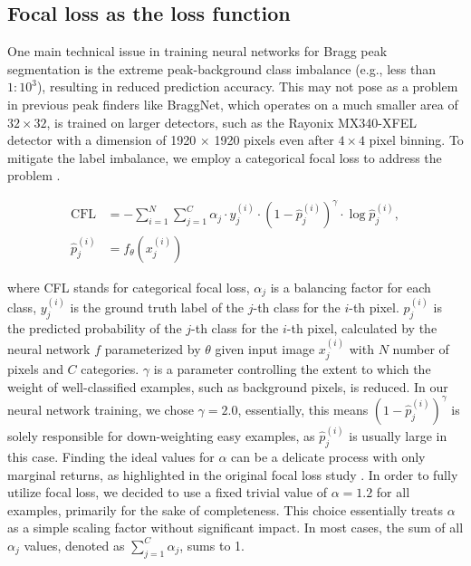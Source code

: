 \documentclass[a4paper]{article}
\begin{document}
\subsection{Focal loss as the loss function}

One main technical issue in training neural networks for Bragg peak segmentation is the extreme peak-background class imbalance (e.g., less than $1 : 10^3$), resulting in reduced prediction accuracy.  This may not pose as a problem in previous peak finders like BraggNet, which operates on a much smaller area of $32 \times 32$, \peaknet{} is trained on larger detectors, such as the Rayonix MX340-XFEL detector with a dimension of 1920 $\times$ 1920 pixels even after $4 \times 4$ pixel binning.  To mitigate the label imbalance, we employ a categorical focal loss to address the problem \citep{linFocalLossDense2018}.

\begin{align}
\text{CFL} &= - \sum_{i = 1}^{N}\sum_{j = 1}^{C} 
            \alpha_j \cdot y_j^{(i)} \cdot (1-\hat{p}_j^{(i)})^\gamma 
            \cdot \log{\hat{p}_j^{(i)}}, \\
\hat{p}_j^{(i)} &= f_\theta(x_j^{(i)})
\end{align}

where CFL stands for categorical focal loss, $\alpha_j$ is a balancing factor for each class, $y_j^{(i)}$ is the ground truth label of the $j$-th class for the $i$-th pixel.  $p_j^{(i)}$ is the predicted probability of the $j$-th class for the $i$-th pixel, calculated by the neural network $f$ parameterized by $\theta$ given input image $x_j^{(i)}$ with $N$ number of pixels and $C$ categories.  $\gamma$ is a parameter controlling the extent to which the weight of well-classified examples, such as background pixels, is reduced.  In our neural network training, we chose $\gamma = 2.0$, essentially, this means $(1-\hat{p}_j^{(i)}) ^\gamma$ is solely responsible for down-weighting easy examples, as $\hat{p}_j^{(i)}$ is usually large in this case.  Finding the ideal values for $\alpha$ can be a delicate process with only marginal returns, as highlighted in the original focal loss study \citep{linFocalLossDense2018}.  In order to fully utilize focal loss, we decided to use a fixed trivial value of $\alpha = 1.2$ for all examples, primarily for the sake of completeness.  This choice essentially treats $\alpha$ as a simple scaling factor without significant impact.  In most cases, the sum of all $\alpha_j$ values, denoted as $\sum_{j = 1}^{C} \alpha_j$, sums to 1.
\end{document}
